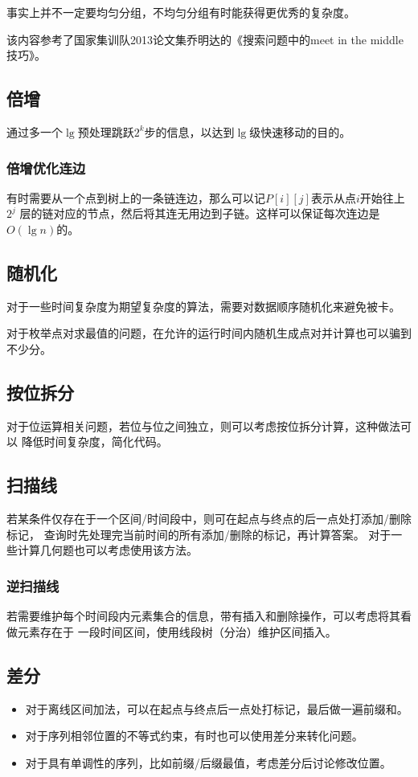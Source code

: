 事实上并不一定要均匀分组，不均匀分组有时能获得更优秀的复杂度。

该内容参考了国家集训队2013论文集乔明达的《搜索问题中的meet in the middle技巧》。
\subsection{倍增}
通过多一个$\lg$预处理跳跃$2^k$步的信息，以达到$\lg$级快速移动的目的。

\subsubsection{倍增优化连边}
有时需要从一个点到树上的一条链连边，那么可以记$P[i][j]$表示从点$i$开始往上$2^j$
层的链对应的节点，然后将其连无用边到子链。这样可以保证每次连边是$O(\lg n)$的。
\subsection{随机化}
对于一些时间复杂度为期望复杂度的算法，需要对数据顺序随机化来避免被卡。

对于枚举点对求最值的问题，在允许的运行时间内随机生成点对并计算也可以骗到不少分。
\subsection{按位拆分}
对于位运算相关问题，若位与位之间独立，则可以考虑按位拆分计算，这种做法可以
降低时间复杂度，简化代码。
\subsection{扫描线}
若某条件仅存在于一个区间/时间段中，则可在起点与终点的后一点处打添加/删除标记，
查询时先处理完当前时间的所有添加/删除的标记，再计算答案。
对于一些计算几何题也可以考虑使用该方法。

\subsubsection{逆扫描线}
若需要维护每个时间段内元素集合的信息，带有插入和删除操作，可以考虑将其看做元素存在于
一段时间区间，使用线段树（分治）维护区间插入。
\subsection{差分}
\begin{itemize}
	\item 对于离线区间加法，可以在起点与终点后一点处打标记，最后做一遍前缀和。
	\item 对于序列相邻位置的不等式约束，有时也可以使用差分来转化问题。
	\item 对于具有单调性的序列，比如前缀/后缀最值，考虑差分后讨论修改位置。
\end{itemize}
